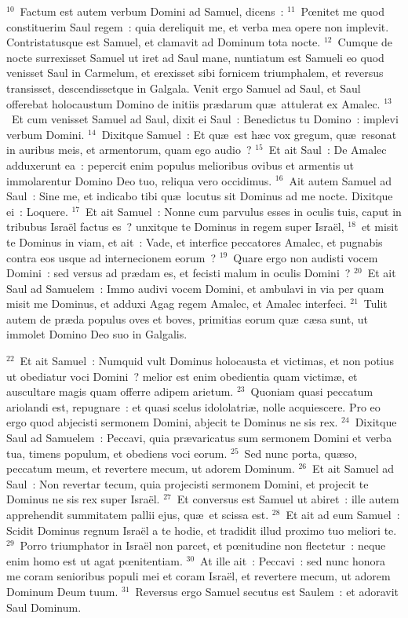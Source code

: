 ${}^{10}$~Factum est autem verbum Domini ad Samuel, dicens~:
${}^{11}$~Pœnitet me quod constituerim Saul regem~: quia dereliquit me, et verba mea opere non implevit. Contristatusque est Samuel, et clamavit ad Dominum tota nocte.
${}^{12}$~Cumque de nocte surrexisset Samuel ut iret ad Saul mane, nuntiatum est Samueli eo quod venisset Saul in Carmelum, et erexisset sibi fornicem triumphalem, et reversus transisset, descendissetque in Galgala. Venit ergo Samuel ad Saul, et Saul offerebat holocaustum Domino de initiis pr\ae darum qu\ae\ attulerat ex Amalec.
${}^{13}$~Et cum venisset Samuel ad Saul, dixit ei Saul~: Benedictus tu Domino~: implevi verbum Domini.
${}^{14}$~Dixitque Samuel~: Et qu\ae\ est h\ae c vox gregum, qu\ae\ resonat in auribus meis, et armentorum, quam ego audio~?
${}^{15}$~Et ait Saul~: De Amalec adduxerunt ea~: pepercit enim populus melioribus ovibus et armentis ut immolarentur Domino Deo tuo, reliqua vero occidimus.
${}^{16}$~Ait autem Samuel ad Saul~: Sine me, et indicabo tibi qu\ae\ locutus sit Dominus ad me nocte. Dixitque ei~: Loquere.
${}^{17}$~Et ait Samuel~: Nonne cum parvulus esses in oculis tuis, caput in tribubus Isra\"el factus es~? unxitque te Dominus in regem super Isra\"el,
${}^{18}$~et misit te Dominus in viam, et ait~: Vade, et interfice peccatores Amalec, et pugnabis contra eos usque ad internecionem eorum~?
${}^{19}$~Quare ergo non audisti vocem Domini~: sed versus ad pr\ae dam es, et fecisti malum in oculis Domini~?
${}^{20}$~Et ait Saul ad Samuelem~: Immo audivi vocem Domini, et ambulavi in via per quam misit me Dominus, et adduxi Agag regem Amalec, et Amalec interfeci.
${}^{21}$~Tulit autem de pr\ae da populus oves et boves, primitias eorum qu\ae\ c\ae sa sunt, ut immolet Domino Deo suo in Galgalis.


${}^{22}$~Et ait Samuel~: Numquid vult Dominus holocausta et victimas, et non potius ut obediatur voci Domini~? melior est enim obedientia quam victim\ae , et auscultare magis quam offerre adipem arietum.
${}^{23}$~Quoniam quasi peccatum ariolandi est, repugnare~: et quasi scelus idololatri\ae , nolle acquiescere. Pro eo ergo quod abjecisti sermonem Domini, abjecit te Dominus ne sis rex.
${}^{24}$~Dixitque Saul ad Samuelem~: Peccavi, quia pr\ae varicatus sum sermonem Domini et verba tua, timens populum, et obediens voci eorum.
${}^{25}$~Sed nunc porta, qu\ae so, peccatum meum, et revertere mecum, ut adorem Dominum.
${}^{26}$~Et ait Samuel ad Saul~: Non revertar tecum, quia projecisti sermonem Domini, et projecit te Dominus ne sis rex super Isra\"el.
${}^{27}$~Et conversus est Samuel ut abiret~: ille autem apprehendit summitatem pallii ejus, qu\ae\ et scissa est.
${}^{28}$~Et ait ad eum Samuel~: Scidit Dominus regnum Isra\"el a te hodie, et tradidit illud proximo tuo meliori te.
${}^{29}$~Porro triumphator in Isra\"el non parcet, et pœnitudine non flectetur~: neque enim homo est ut agat pœnitentiam.
${}^{30}$~At ille ait~: Peccavi~: sed nunc honora me coram senioribus populi mei et coram Isra\"el, et revertere mecum, ut adorem Dominum Deum tuum.
${}^{31}$~Reversus ergo Samuel secutus est Saulem~: et adoravit Saul Dominum.


